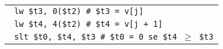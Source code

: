 \documentclass[../main.tex]{subfiles}
\begin{document}
\begin{tabular}{ l }
    \texttt{\hspace*{0cm} \hspace*{0cm} \hspace*{0cm} \hspace*{0cm} \hspace*{0cm} \hspace*{0cm} \hspace*{0cm} \hspace*{0cm} \hspace*{0cm} lw \$t3, 0(\$t2) \hspace*{0cm} \hspace*{0cm} \hspace*{0cm} \hspace*{0cm} \hspace*{0cm} \hspace*{0cm} \hspace*{0cm} \hspace*{0cm} \# \$t3 = v[j]} \\
    \texttt{\hspace*{0cm} \hspace*{0cm} \hspace*{0cm} \hspace*{0cm} \hspace*{0cm} \hspace*{0cm} \hspace*{0cm} \hspace*{0cm} \hspace*{0cm} lw \$t4, 4(\$t2) \hspace*{0cm} \hspace*{0cm} \hspace*{0cm} \hspace*{0cm} \hspace*{0cm} \hspace*{0cm} \hspace*{0cm} \hspace*{0cm} \# \$t4 = v[j + 1]} \\
    \texttt{\hspace*{0cm} \hspace*{0cm} \hspace*{0cm} \hspace*{0cm} \hspace*{0cm} \hspace*{0cm} \hspace*{0cm} \hspace*{0cm} \hspace*{0cm} slt \$t0, \$t4, \$t3 \hspace*{0cm} \hspace*{0cm} \hspace*{0cm} \hspace*{0cm} \hspace*{0cm} \# \$t0 = 0 se \$t4 $\geq$ \$t3} \\

\end{tabular}
\end{document}

